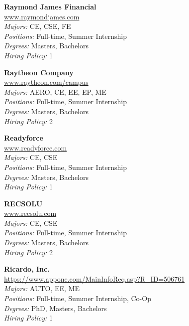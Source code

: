 \documentclass[twoside]{article}
\begin{document}
\begin{center}
\begin{multicols}{3}
\begin{minipage}{.9\columnwidth}{\Large\bf Raymond James Financial }\\
	\url{www.raymondjames.com}\\
	\emph{Majors:} CE, CSE, FE\\
	\emph{Positions:} Full-time, Summer Internship\\
	\emph{Degrees:} Masters, Bachelors\\
	\emph{Hiring Policy:} 1\\
\end{minipage}
 
\begin{minipage}{.9\columnwidth}{\Large\bf Raytheon Company }\\
	\url{www.raytheon.com/campus}\\
	\emph{Majors:} AERO, CE, EE, EP, ME\\
	\emph{Positions:} Full-time, Summer Internship\\
	\emph{Degrees:} Masters, Bachelors\\
	\emph{Hiring Policy:} 2\\
\end{minipage}
 
\begin{minipage}{.9\columnwidth}{\Large\bf Readyforce }\\
	\url{www.readyforce.com}\\
	\emph{Majors:} CE, CSE\\
	\emph{Positions:} Full-time, Summer Internship\\
	\emph{Degrees:} Masters, Bachelors\\
	\emph{Hiring Policy:} 1\\
\end{minipage}
 
\begin{minipage}{.9\columnwidth}{\Large\bf RECSOLU }\\
	\url{www.recsolu.com}\\
	\emph{Majors:} CE, CSE\\
	\emph{Positions:} Full-time, Summer Internship\\
	\emph{Degrees:} Masters, Bachelors\\
	\emph{Hiring Policy:} 2\\
\end{minipage}
 
\begin{minipage}{.9\columnwidth}{\Large\bf Ricardo, Inc. }\\
	\url{https://www.appone.com/MainInfoReq.asp?R_ID=506761}\\
	\emph{Majors:} AUTO, EE, ME\\
	\emph{Positions:} Full-time, Summer Internship, Co-Op\\
	\emph{Degrees:} PhD, Masters, Bachelors\\
	\emph{Hiring Policy:} 1\\
\end{minipage}
 

\end{multicols}
\end{center}
\end{document}
